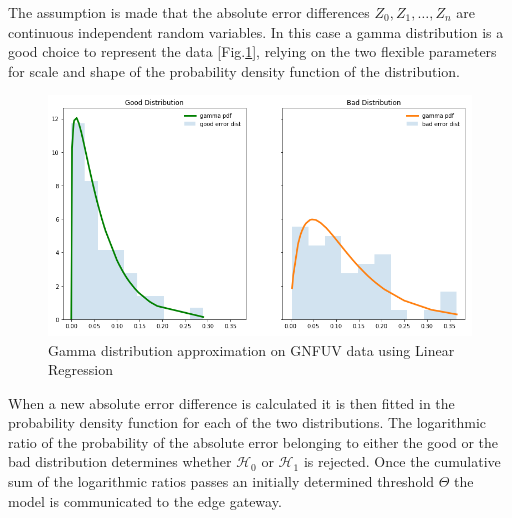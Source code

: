 \documentclass{mpaper}
\begin{document}
The assumption is made that the absolute error differences $Z_0, Z_1, \dotsc , Z_n $ are continuous independent random variables. In this case a gamma distribution is a good choice to represent the data  [Fig.\ref{fig:goodvsbad}], relying on the two flexible parameters for scale and shape of the probability density function of the distribution.

\begin{figure}[h]
    \centering
    \includegraphics[scale=0.3]{imgs/goodVSbad.png}
    \caption{Gamma distribution approximation on GNFUV data using Linear Regression}
    \label{fig:goodvsbad}
\end{figure}

When a new absolute error difference is calculated it is then fitted in the probability density function for each of the two distributions. The logarithmic ratio of the probability of the absolute error belonging to either the good or the bad distribution determines whether $\mathcal{H}_0$ or $\mathcal{H}_1$ is rejected. Once the cumulative sum of the logarithmic ratios passes an initially determined threshold $\Theta$ the model is communicated to the edge gateway.
\end{document}
